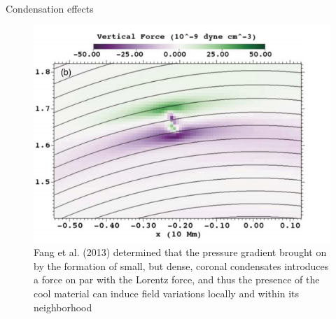 \documentclass{beamer}
\begin{document}
\begin{frame}{Condensation effects}

\begin{figure}[H]
    \includegraphics[scale=0.4]{fang1.png}
    \caption{
Fang et al. (2013) determined that the
pressure gradient brought on by the formation of small, but
dense, coronal condensates introduces a force on par with the
Lorentz force, and thus the presence of the cool material can
induce field variations locally and within its neighborhood
    } 
\end{figure}

\end{frame}
\end{document}
